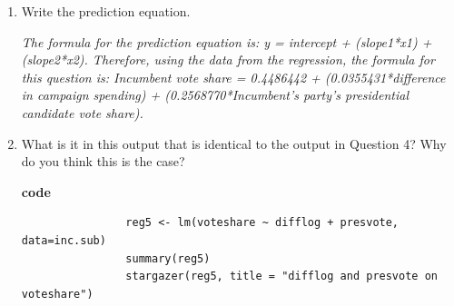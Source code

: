 \documentclass[12pt,letterpaper]{article}
\begin{document}
\begin{enumerate}
		\textit{Interpretation of regression: The intercept is 0.4486442, the regression coefficient of difflog is 0.0355431 and for presvote is 0.2568770 , representing a positive relationship between both explanatory variables on the outcome variable, it indicates that as the difference in campaign expenditure increases and vote share of incumbent's party's presidential candidate increases, so does the incumbent's vote share. However, the relationship appears much stronger between presvote and voteshare.The p-value is <2e-16 for both explanatory variables, which suggests the probability of obtaining results at least as extreme as those observed, with such a small p-value, we can reject the null hypotheses that there is no between both variables and incumbent's vote share.}\vspace{.5cm}
		
		\item Write the prediction equation.	\vspace{.5cm}
		
		\textit{The formula for the prediction equation is: y = intercept + (slope1*x1) + (slope2*x2). Therefore, using the data from the regression, the formula for this question is: Incumbent vote share = 0.4486442 + (0.0355431*difference in campaign spending) + (0.2568770*Incumbent's party's presidential candidate vote share).}\vspace{.5cm}
		
		
		\item What is it in this output that is identical to the output in Question 4? Why do you think this is the case?

			\textbf{code}		
			\begin{verbatim}
				reg5 <- lm(voteshare ~ difflog + presvote, data=inc.sub)
				summary(reg5)
				stargazer(reg5, title = "difflog and presvote on voteshare")
			\end{verbatim}		
		

\end{enumerate}
\end{document}
